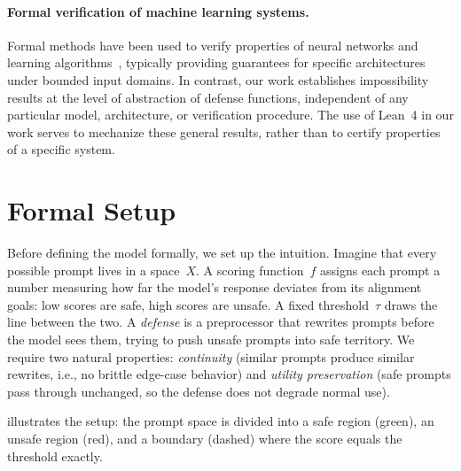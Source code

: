 \documentclass[11pt]{article}
\begin{document}
\paragraph{Formal verification of machine learning systems.}
Formal methods have been used to verify properties of neural networks
and learning algorithms~\cite{katz2017reluplex,singh2019abstract,
huang2017safety,bagnall2019certifying}, typically providing guarantees
for specific architectures under bounded input domains. In contrast,
our work establishes impossibility results at the level of abstraction
of defense functions, independent of any particular model, architecture,
or verification procedure. The use of Lean~4 in our work serves to
mechanize these general results, rather than to certify properties of
a specific system.


\section{Formal Setup}
\label{sec:setup}

Before defining the model formally, we set up the intuition.
Imagine that every possible prompt lives in a space~$X$. A scoring
function~$f$ assigns each prompt a number measuring how far the
model's response deviates from its alignment goals: low scores are
safe, high scores are unsafe. A fixed threshold~$\tau$ draws the
line between the two. A \emph{defense} is a preprocessor that
rewrites prompts before the model sees them, trying to push unsafe
prompts into safe territory. We require two natural properties:
\emph{continuity} (similar prompts produce similar rewrites, i.e., no
brittle edge-case behavior) and \emph{utility preservation} (safe
prompts pass through unchanged, so the defense does not degrade
normal use).

 illustrates the setup: the prompt space is
divided into a safe region (green), an unsafe region (red), and a
boundary (dashed) where the score equals the threshold exactly.
\end{document}
